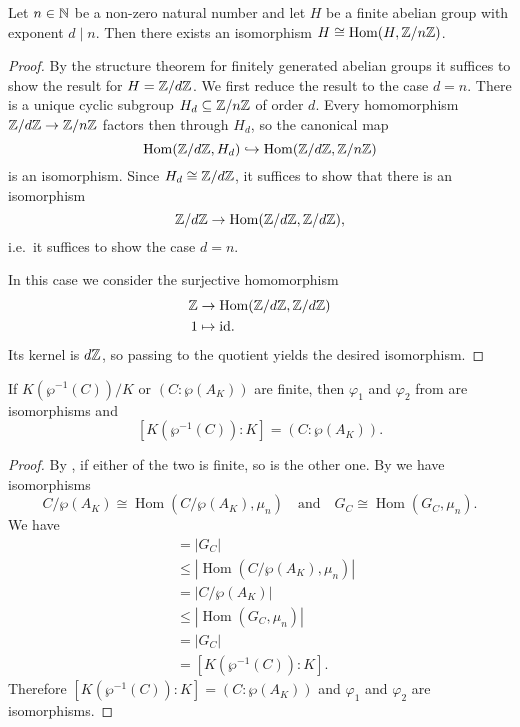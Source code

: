 \documentclass[12pt]{amsart}
\DeclareMathOperator{\Hom}{Hom}
\newcommand{\id}{\mathrm{id}}
\begin{document}
\begin{lm}\label{lm:finiteduality}
    Let $n\in \mathbb{N}$ be a non-zero natural number and let $H$ be a finite abelian group with exponent $d\mid n$.
    Then there exists an isomorphism $H\cong \Hom(H,\Z/n\Z)$.
    \begin{proof}
	By the structure theorem for finitely generated abelian groups it suffices to show the result for $H=\mathbb{Z}/d\mathbb{Z}$.
	We first reduce the result to the case $d=n$.
	There is a unique cyclic subgroup $H_{d}\subseteq \mathbb{Z}/n\mathbb{Z}$ of order $d$.
	Every homomorphism $\mathbb{Z}/d\mathbb{Z}\to \mathbb{Z}/n\mathbb{Z}$ factors then through $H_{d}$, so the canonical map
	\[ \Hom(\Z/d\Z,H_{d})\hookrightarrow \Hom(\Z/d\Z,\Z/n\Z) \]
	is an isomorphism.
	Since $H_{d}\cong \mathbb{Z}/d\mathbb{Z}$, it suffices to show that there is an isomorphism
	\[ \Z/d\Z\to \Hom(\Z/d\Z,\Z/d\Z), \]
	i.e.~it suffices to show the case $d=n$.

	In this case we consider the surjective homomorphism
	\begin{align*}
	    \Z & \to \Hom(\Z/d\Z,\Z/d\Z) \\
	    1 & \mapsto \id.
	\end{align*}
	Its kernel is $d\mathbb{Z}$, so passing to the quotient yields the desired isomorphism.
    \end{proof}
\end{lm}

\begin{prop}\label{prop:finitecase}
    If $K(\wp^{-1}(C))/K$ or $(C:\wp(A_{K}))$ are finite, then $\varphi_{1}$ and $\varphi_{2}$ from  are isomorphisms and
    \[ [K(\wp^{-1}(C)):K]=(C:\wp(A_{K})). \]
    \begin{proof}
	By , if either of the two is finite, so is the other one.
	By  we have isomorphisms
	\[ C/\wp(A_{K})\cong \Hom(C/\wp(A_{K}),\mu_{n})\quad\text{and}\quad G_{C}\cong \Hom(G_{C},\mu_{n}). \]
	We have
	\begin{align*}
	    [K(\wp^{-1}(C)):K] & = |G_{C}| \\
	    & \leqslant |\Hom(C/\wp(A_{K}),\mu_{n})| \\
	    & = |C/\wp(A_{K})| \\
	    & \leqslant |\Hom(G_{C},\mu_{n}) | \\
	    & = |G_{C}| \\
	    & =[K(\wp^{-1}(C)):K].
	\end{align*}
	Therefore $[K(\wp^{-1}(C)):K]=(C:\wp(A_{K}))$ and $\varphi_{1}$ and $\varphi_{2}$ are isomorphisms.
    \end{proof}
\end{prop}
\end{document}
